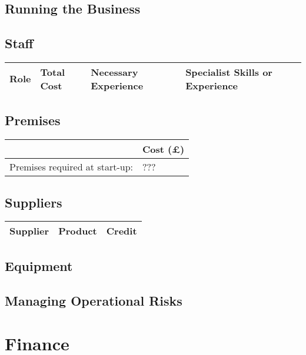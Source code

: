 \documentclass[DIV=calc, paper=a4, fontsize=11pt]{scrartcl}	 %
\begin{document}
\subsection{Running the Business}

\subsection{Staff}
\begin{tabular}{|l|l|l|l|}\hline
Role & Total Cost & Necessary Experience & Specialist Skills or Experience \\ \hline
\end{tabular}

\subsection{Premises}
\begin{tabular}{|l|l|} \hline
                               & Cost (\pounds) \\ \hline
Premises required at start-up: & ???            \\ \hline
\end{tabular}

\subsection{Suppliers}
\begin{tabular}{|l|l|l|} \hline
Supplier & Product & Credit \\ \hline
\end{tabular}

\subsection{Equipment}

\subsection{Managing Operational Risks}

\section{Finance}
\end{document}
